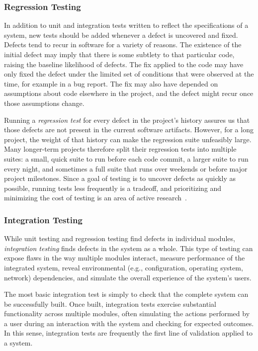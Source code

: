 \subsubsection{Regression Testing}

In addition to unit and integration tests written to reflect the
specifications of a system, new tests should be added whenever a
defect is uncovered and fixed. Defects tend to recur in software for a
variety of reasons. The existence of the initial defect may imply that
there is some subtlety to that particular code, raising the baseline
likelihood of defects. The fix applied to the code may have only fixed
the defect under the limited set of conditions that were observed at
the time, for example in a bug report. The fix may also have depended
on assumptions about code elsewhere in the project, and the defect
might recur once those assumptions change.

Running a \emph{regression test} for every defect in the project's
history assures us that those defects are not present in the current
software artifacts. However, for a long project, the weight of that
history can make the regression suite unfeasibly large. Many
longer-term projects therefore split their regression tests into
multiple suites: a small, quick suite to run before each code commit,
a larger suite to run every night, and sometimes a full suite that
runs over weekends or before major project milestones. Since a goal of
testing is to uncover defects as quickly as possible, running tests
less frequently is a tradeoff, and prioritizing and minimizing the
cost of testing is an area of active
research~\cite{yoo2012regression}.

\subsubsection{Integration Testing}

While unit testing and regression testing find defects in individual
modules, \emph{integration testing} finds defects in the system as a
whole. This type of testing can expose flaws in the way multiple
modules interact, measure performance of the integrated system, reveal
environmental (e.g., configuration, operating system, network)
dependencies, and simulate the overall experience of the system's
users.

The most basic integration test is simply to check that the complete
system can be successfully built. Once built, integration tests
exercise substantial functionality across multiple modules, often
simulating the actions performed by a user during an interaction with
the system and checking for expected outcomes. In this sense,
integration tests are frequently the first line of validation applied
to a system.

